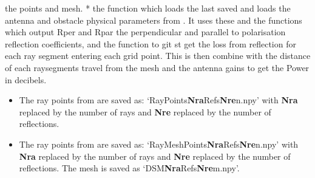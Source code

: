 \documentclass[letterpaper,10pt,english]{sphinxmanual}
\begin{document}
the points and mesh.
* the function {\hyperref[index:RayTracerMainProgram.power_grid]{}} which loads the last saved   and loads the antenna and obstacle physical parameters from   {\hyperref[index:ParameterInput.ObstacleCoefficients]{}}. It uses these and   the functions {\hyperref[index:RayTracerMainProgram.RefCoefComputation]{}} which output Rper   and Rpar the perpendicular and parallel to polarisation reflection   coefficients, and the function {\hyperref[index:RayTracerMainProgram.RefCombine]{}} to git st
get the loss from reflection for each ray segment entering each grid   point. This is then combine with the distance of each raysegments   travel from the mesh and the antenna gains to get the Power in   decibels.
\begin{itemize}
\item {} 
The ray points from {\hyperref[index:RayTracerMainProgram.RayTracer]{}} are saved as:
`RayPoints\textbf{Nra}Refs\textbf{Nre}n.npy' with \textbf{Nra} replaced by the     number of rays and \textbf{Nre} replaced by the number of reflections.

\item {} 
The ray points from {\hyperref[index:RayTracerMainProgram.MeshProgram]{}} are saved as:
`RayMeshPoints\textbf{Nra}Refs\textbf{Nre}n.npy' with \textbf{Nra} replaced     by the     number of rays and \textbf{Nre} replaced by the number of reflections.     The mesh is saved as `DSM\textbf{Nra}Refs\textbf{Nre}m.npy'.

\end{itemize}
\end{document}
